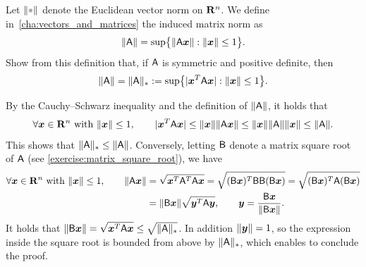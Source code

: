 \begin{exercise}
    Let $\norm{\placeholder}$ denote the Euclidean vector norm on $\mathbf R^n$.
    We define in~\cref{cha:vectors_and_matrices} the induced matrix norm as
    \[
        \lVert\mathsf A\rVert = \sup \bigl\{ \lVert\mathsf A \mathbf{\boldsymbol{x}}\rVert: \lVert\mathbf{\boldsymbol{x}}\rVert \leq 1 \bigr\}.
    \]
    Show from this definition that, if $\mathsf A$ is symmetric and positive definite,
    then
    \[
        \lVert\mathsf A\rVert = \lVert\mathsf A\rVert_* := \sup \bigl\{ \lvert\mathbf{\boldsymbol{x}}^T \mathsf A \mathbf{\boldsymbol{x}}\rvert: \lVert\mathbf{\boldsymbol{x}}\rVert \leq 1 \bigr\}.
    \]
\end{exercise}
\begin{solution}
    By the Cauchy--Schwarz inequality and the definition of $\lVert\mathsf A\rVert$,
    it holds that
    \[
        \forall \mathbf{\boldsymbol{x}} \in \mathbf R^n \text{ with } \lVert\mathbf{\boldsymbol{x}}\rVert \leq 1, \qquad
         \lvert\mathbf{\boldsymbol{x}}^T \mathsf A \mathbf{\boldsymbol{x}}\rvert
         \leq \lVert\mathbf{\boldsymbol{x}}\rVert \lVert\mathsf A \mathbf{\boldsymbol{x}}\rVert
         \leq \lVert\mathbf{\boldsymbol{x}}\rVert \lVert\mathsf A\rVert \lVert\mathbf{\boldsymbol{x}}\rVert \leq \lVert\mathsf A\rVert.
    \]
    This shows that $\lVert\mathsf A\rVert_* \leq \lVert\mathsf A\rVert$.
    Conversely,
    letting $\mathsf B$ denote a matrix square root of $\mathsf A$ (see \cref{exercise:matrix_square_root}),
    we have
    \begin{align*}
        \forall \mathbf{\boldsymbol{x}} \in \mathbf R^n \text{ with } \lVert\mathbf{\boldsymbol{x}}\rVert \leq 1, \qquad
        \lVert\mathsf A \mathbf{\boldsymbol{x}}\rVert
        &= \sqrt{\mathbf{\boldsymbol{x}}^T \mathsf A^T \mathsf A \mathbf{\boldsymbol{x}}}
        = \sqrt{(\mathsf B\mathbf{\boldsymbol{x}})^T \mathsf B \mathsf B (\mathsf B\mathbf{\boldsymbol{x}})}
        = \sqrt{(\mathsf B\mathbf{\boldsymbol{x}})^T \mathsf A (\mathsf B\mathbf{\boldsymbol{x}})} \\
        &= \lVert\mathsf B \mathbf{\boldsymbol{x}}\rVert \sqrt{\mathbf{\boldsymbol{y}}^T \mathsf A \mathbf{\boldsymbol{y}}},
        \qquad \mathbf{\boldsymbol{y}} = \frac{\mathsf B \mathbf{\boldsymbol{x}}}{\lVert\mathsf B \mathbf{\boldsymbol{x}}\rVert}.
    \end{align*}
    It holds that $\lVert\mathsf B \mathbf{\boldsymbol{x}}\rVert = \sqrt{\mathbf{\boldsymbol{x}}^T \mathsf A \mathbf{\boldsymbol{x}}} \leq \sqrt{\lVert\mathsf A\rVert_*}$.
    In addition $\lVert\mathbf{\boldsymbol{y}}\rVert = 1$,
    so the expression inside the square root is bounded from above by $\lVert\mathsf A\rVert_*$,
    which enables to conclude the proof.
\end{solution}

